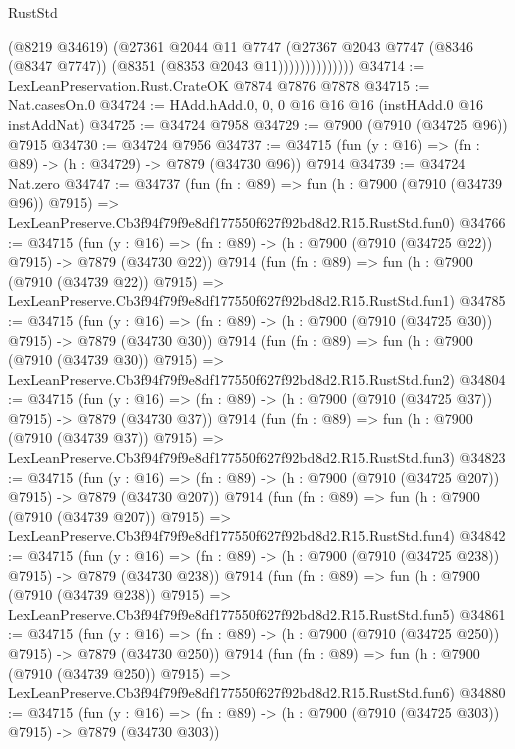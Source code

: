 \begin{lexlean}{RustStd}
\begin{coremodule}
                        (@8219 @34619)
                        (@27361
                          @2044
                          @11
                          @7747
                          (@27367
                            @2043
                            @7747
                            (@8346 (@8347 @7747))
                            (@8351 (@8353 @2043 @11))))))))))))))
@34714 := LexLeanPreservation.Rust.CrateOK @7874 @7876 @7878
@34715 := Nat.casesOn.{0}
@34724 := HAdd.hAdd.{0, 0, 0} @16 @16 @16 (instHAdd.{0} @16 instAddNat)
@34725 := @34724 @7958
@34729 := @7900 (@7910 (@34725 @96)) @7915
@34730 := @34724 @7956
@34737 := @34715 (fun (y : @16) => (fn : @89) -> (h : @34729) -> @7879 (@34730 @96)) @7914
@34739 := @34724 Nat.zero
@34747 := @34737
    (fun (fn : @89) =>
    fun (h : @7900 (@7910 (@34739 @96)) @7915) =>
    LexLeanPreserve.Cb3f94f79f9e8df177550f627f92bd8d2.R15.RustStd.fun0)
@34766 := @34715
    (fun (y : @16) => (fn : @89) -> (h : @7900 (@7910 (@34725 @22)) @7915) -> @7879 (@34730 @22))
    @7914
    (fun (fn : @89) =>
    fun (h : @7900 (@7910 (@34739 @22)) @7915) =>
    LexLeanPreserve.Cb3f94f79f9e8df177550f627f92bd8d2.R15.RustStd.fun1)
@34785 := @34715
    (fun (y : @16) => (fn : @89) -> (h : @7900 (@7910 (@34725 @30)) @7915) -> @7879 (@34730 @30))
    @7914
    (fun (fn : @89) =>
    fun (h : @7900 (@7910 (@34739 @30)) @7915) =>
    LexLeanPreserve.Cb3f94f79f9e8df177550f627f92bd8d2.R15.RustStd.fun2)
@34804 := @34715
    (fun (y : @16) => (fn : @89) -> (h : @7900 (@7910 (@34725 @37)) @7915) -> @7879 (@34730 @37))
    @7914
    (fun (fn : @89) =>
    fun (h : @7900 (@7910 (@34739 @37)) @7915) =>
    LexLeanPreserve.Cb3f94f79f9e8df177550f627f92bd8d2.R15.RustStd.fun3)
@34823 := @34715
    (fun (y : @16) => (fn : @89) -> (h : @7900 (@7910 (@34725 @207)) @7915) -> @7879 (@34730 @207))
    @7914
    (fun (fn : @89) =>
    fun (h : @7900 (@7910 (@34739 @207)) @7915) =>
    LexLeanPreserve.Cb3f94f79f9e8df177550f627f92bd8d2.R15.RustStd.fun4)
@34842 := @34715
    (fun (y : @16) => (fn : @89) -> (h : @7900 (@7910 (@34725 @238)) @7915) -> @7879 (@34730 @238))
    @7914
    (fun (fn : @89) =>
    fun (h : @7900 (@7910 (@34739 @238)) @7915) =>
    LexLeanPreserve.Cb3f94f79f9e8df177550f627f92bd8d2.R15.RustStd.fun5)
@34861 := @34715
    (fun (y : @16) => (fn : @89) -> (h : @7900 (@7910 (@34725 @250)) @7915) -> @7879 (@34730 @250))
    @7914
    (fun (fn : @89) =>
    fun (h : @7900 (@7910 (@34739 @250)) @7915) =>
    LexLeanPreserve.Cb3f94f79f9e8df177550f627f92bd8d2.R15.RustStd.fun6)
@34880 := @34715
    (fun (y : @16) => (fn : @89) -> (h : @7900 (@7910 (@34725 @303)) @7915) -> @7879 (@34730 @303))

\end{coremodule}
\end{lexlean}

